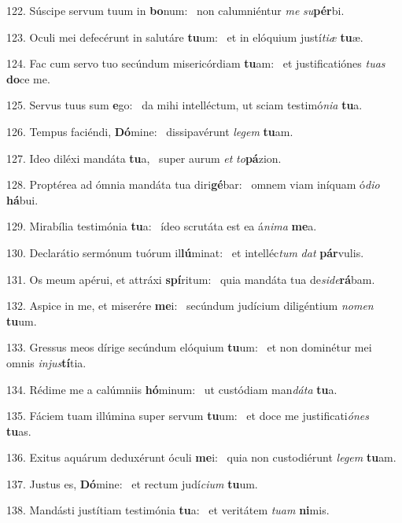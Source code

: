 122. Súscipe servum tuum in \textbf{bo}num: \ast\  non calumniéntur \textit{me} \textit{su}\textbf{pér}bi.\

123. Oculi mei defecérunt in salutáre \textbf{tu}um: \ast\  et in elóquium justí\textit{ti}\textit{æ} \textbf{tu}æ.\

124. Fac cum servo tuo secúndum misericórdiam \textbf{tu}am: \ast\  et justificatiónes \textit{tu}\textit{as} \textbf{do}ce me.\

125. Servus tuus sum \textbf{e}go: \ast\  da mihi intelléctum, ut sciam testimó\textit{ni}\textit{a} \textbf{tu}a.\

126. Tempus faciéndi, \textbf{Dó}mine: \ast\  dissipavérunt \textit{le}\textit{gem} \textbf{tu}am.\

127. Ideo diléxi mandáta \textbf{tu}a, \ast\  super aurum \textit{et} \textit{to}\textbf{pá}zion.\

128. Proptérea ad ómnia mandáta tua diri\textbf{gé}bar: \ast\  omnem viam iníquam ó\textit{di}\textit{o} \textbf{há}bui.\

129. Mirabília testimónia \textbf{tu}a: \ast\  ídeo scrutáta est ea á\textit{ni}\textit{ma} \textbf{me}a.\

130. Declarátio sermónum tuórum il\textbf{lú}minat: \ast\  et intelléc\textit{tum} \textit{dat} \textbf{pár}vulis.\

131. Os meum apérui, et attráxi \textbf{spí}ritum: \ast\  quia mandáta tua de\textit{si}\textit{de}\textbf{rá}bam.\

132. Aspice in me, et miserére \textbf{me}i: \ast\  secúndum judícium diligéntium \textit{no}\textit{men} \textbf{tu}um.\

133. Gressus meos dírige secúndum elóquium \textbf{tu}um: \ast\  et non dominétur mei omnis \textit{in}\textit{jus}\textbf{tí}tia.\

134. Rédime me a calúmniis \textbf{hó}minum: \ast\  ut custódiam man\textit{dá}\textit{ta} \textbf{tu}a.\

135. Fáciem tuam illúmina super servum \textbf{tu}um: \ast\  et doce me justificati\textit{ó}\textit{nes} \textbf{tu}as.\

136. Exitus aquárum deduxérunt óculi \textbf{me}i: \ast\  quia non custodiérunt \textit{le}\textit{gem} \textbf{tu}am.\

137. Justus es, \textbf{Dó}mine: \ast\  et rectum judí\textit{ci}\textit{um} \textbf{tu}um.\

138. Mandásti justítiam testimónia \textbf{tu}a: \ast\  et veritátem \textit{tu}\textit{am} \textbf{ni}mis.\

